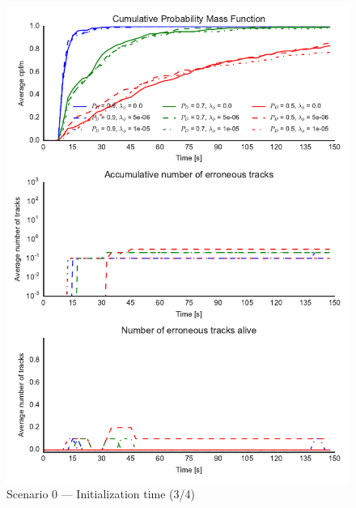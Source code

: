 \begin{figure}
\centering
\includegraphics{Figures/plots/Scenario0_Init-Time(3-4).pdf}
\caption{Scenario 0 --- Initialization time (3/4)}\label{fig:init0_time_3-4}
\end{figure}

